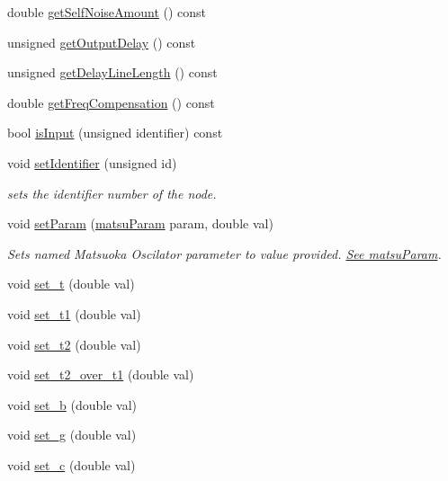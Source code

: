 \begin{DoxyCompactItemize}
double \hyperlink{classMatsuNode_a7b714f6206eb03dd8f7b86163ac73c03}{get\+Self\+Noise\+Amount} () const 
\item 
unsigned \hyperlink{classMatsuNode_a2ad8964145559934847aebb7bc53b323}{get\+Output\+Delay} () const 
\item 
unsigned \hyperlink{classMatsuNode_a2258fc7c0192cb00fe3ed51607543d45}{get\+Delay\+Line\+Length} () const 
\item 
double \hyperlink{classMatsuNode_a1dba528b85813c23cd6348ec43ff142d}{get\+Freq\+Compensation} () const 
\item 
bool \hyperlink{classMatsuNode_a31e631cfabf9c60ebefce93f70d2dfee}{is\+Input} (unsigned identifier) const 
\item 
void \hyperlink{classMatsuNode_aff58c0ee6aaaaa21f3f8ef532728cacc}{set\+Identifier} (unsigned id)
\begin{DoxyCompactList}\small\item\em sets the identifier number of the node. \end{DoxyCompactList}\item 
void \hyperlink{classMatsuNode_aa207e9b0d5de53e9aa1c84f3aae46178}{set\+Param} (\hyperlink{classMatsuNode_aed801e1d0363292efc99bb02f1911386}{matsu\+Param} param, double val)
\begin{DoxyCompactList}\small\item\em Sets named Matsuoka Oscilator parameter to value provided. \hyperlink{classMatsuNode_aed801e1d0363292efc99bb02f1911386}{See matsu\+Param}. \end{DoxyCompactList}\item 
void \hyperlink{classMatsuNode_af68c93af36bc872c0b99c2060648fde5}{set\+\_\+t} (double val)
\item 
void \hyperlink{classMatsuNode_ae082ffc97e6744b6fce1d6bc94efbca2}{set\+\_\+t1} (double val)
\item 
void \hyperlink{classMatsuNode_ab2b901994e0811066e3c452414fcbad7}{set\+\_\+t2} (double val)
\item 
void \hyperlink{classMatsuNode_abc14c3e623fd341dc012a6640bbf1ebd}{set\+\_\+t2\+\_\+over\+\_\+t1} (double val)
\item 
void \hyperlink{classMatsuNode_a6d67de2da757be9edc89247e8c25b892}{set\+\_\+b} (double val)
\item 
void \hyperlink{classMatsuNode_a4ef14db52c49e5ad16c58f35e6356bd6}{set\+\_\+g} (double val)
\item 
void \hyperlink{classMatsuNode_a9b413bb1cfd2f899be5d6c795c2925d5}{set\+\_\+c} (double val)
\item 

\end{DoxyCompactItemize}

